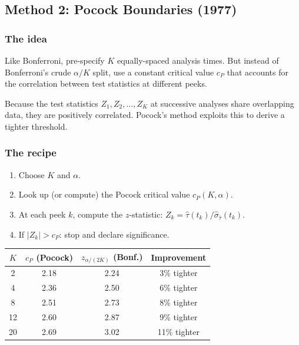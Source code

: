 \documentclass[12pt, a4paper]{article}
\begin{document}
\subsection{Method 2: Pocock Boundaries (1977)}

\subsubsection*{The idea}

Like Bonferroni, pre-specify $K$ equally-spaced analysis times.  But instead
of Bonferroni's crude $\alpha/K$ split, use a constant critical value $c_P$
that accounts for the correlation between test statistics at different peeks.

Because the test statistics $Z_1, Z_2, \ldots, Z_K$ at successive analyses
share overlapping data, they are positively correlated.  Pocock's method
exploits this to derive a tighter threshold.

\subsubsection*{The recipe}

\begin{enumerate}[nosep]
  \item Choose $K$ and $\alpha$.
  \item Look up (or compute) the Pocock critical value $c_P(K, \alpha)$.
  \item At each peek $k$, compute the $z$-statistic:
        $Z_k = \hat{\tau}(t_k) / \hat{\sigma}_{\hat{\tau}}(t_k)$.
  \item If $|Z_k| > c_P$: stop and declare significance.
\end{enumerate}

\begin{center}
\renewcommand{\arraystretch}{1.3}
\begin{tabular}{@{} c c c c @{}}
\toprule
$K$ & $c_P$ (Pocock) & $z_{\alpha/(2K)}$ (Bonf.) & Improvement \\
\midrule
2  & 2.18 & 2.24 & 3\% tighter \\
4  & 2.36 & 2.50 & 6\% tighter \\
8  & 2.51 & 2.73 & 8\% tighter \\
12 & 2.60 & 2.87 & 9\% tighter \\
20 & 2.69 & 3.02 & 11\% tighter \\
\bottomrule
\end{tabular}
\end{center}
\end{document}

